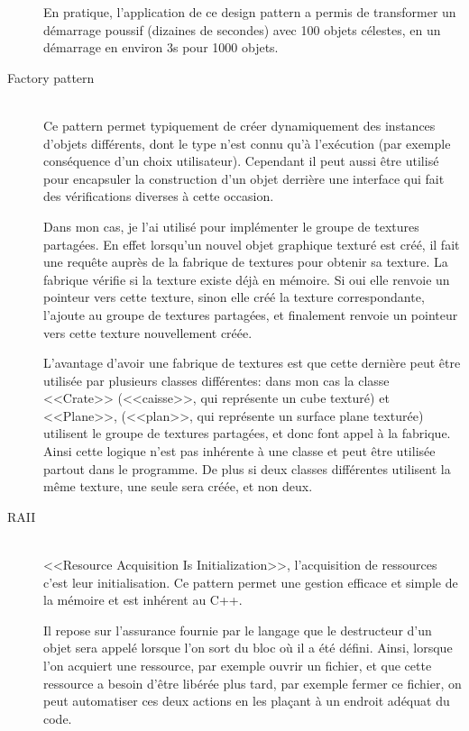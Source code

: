 \documentclass[a4paper,french,12pt]{article}
\begin{document}
\begin{description}
	      En pratique, l'application de ce design pattern a permis de transformer un démarrage poussif (dizaines de secondes) avec 100 objets célestes,
	      en un démarrage en environ 3s pour 1000 objets.
	    
	    \item [Factory pattern]~\\
	      Ce pattern permet typiquement de créer dynamiquement des instances d'objets différents, dont le type 
	      n'est connu qu'à l'exécution (par exemple conséquence d'un choix utilisateur).
	      Cependant il peut aussi être utilisé pour encapsuler la construction d'un objet derrière une interface
	      qui fait des vérifications diverses à cette occasion.
	      
	      Dans mon cas, je l'ai utilisé pour implémenter le groupe de textures partagées. En effet lorsqu'un nouvel
	      objet graphique texturé est créé, il fait une requête auprès de la fabrique de textures pour obtenir sa texture.
	      La fabrique vérifie si la texture existe déjà en mémoire.
	      Si oui elle renvoie un pointeur vers cette texture, sinon elle créé la texture correspondante, l'ajoute 
	      au groupe de textures partagées, et finalement renvoie un pointeur vers cette texture nouvellement créée.
	      
	      L'avantage d'avoir une fabrique de textures est que cette dernière peut être utilisée par plusieurs classes
	      différentes: dans mon cas la classe <<Crate>> (<<caisse>>, qui représente un cube texturé) et <<Plane>>, 
	      (<<plan>>, qui représente un surface plane texturée) utilisent le groupe de textures partagées, et donc 
	      font appel à la fabrique.
	      Ainsi cette logique n'est pas inhérente à une classe et peut être utilisée partout dans le programme.
	      De plus si deux classes différentes utilisent la même texture, une seule sera créée, et non deux.
	    
	    \item [RAII]~\\
	      \label{RAII}
	      <<Resource Acquisition Is Initialization>>, l'acquisition de ressources c'est leur initialisation.
	      Ce pattern permet une gestion efficace et simple de la mémoire et est inhérent au C++.
	      
	      Il repose sur l'assurance fournie par le langage que le destructeur d'un objet sera appelé lorsque l'on
	      sort du bloc où il a été défini.
	      Ainsi, lorsque l'on acquiert une ressource, par exemple ouvrir un fichier, et que cette ressource a besoin
	      d'être libérée plus tard, par exemple fermer ce fichier, on peut automatiser ces deux actions en les plaçant
	      à un endroit adéquat du code.
	      

\end{description}
\end{document}
